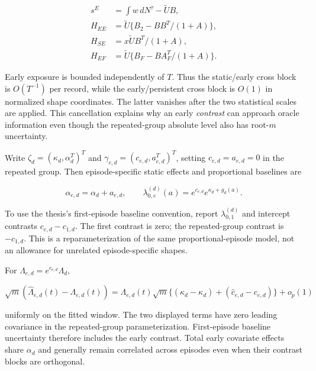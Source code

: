 \documentclass[11pt]{article}
\begin{document}
\begin{equation*}
\begin{aligned}
s^E&=\int w\,dN^\tau-\widetilde U B,\\
H_{EE}&=\widetilde U\{B_2-BB^T/(1+A)\},\\
H_{SE}&=x\widetilde U B^T/(1+A),\\
H_{EF}&=\widetilde U\{B_F-BA_F^T/(1+A)\}.
\end{aligned}\tag{53}\label{eq:53}
\end{equation*}

Early exposure is bounded independently of \(T\). Thus the static/early cross block is \(O(T^{-1})\) per record, while the early/persistent cross block is \(O(1)\) in normalized shape coordinates. The latter vanishes after the two statistical scales are applied. This cancellation explains why an early \emph{contrast} can approach oracle information even though the repeated-group absolute level also has root-\(m\) uncertainty.

Write \(\zeta_d=(\kappa_d,\alpha_d^T)^T\) and
\(\gamma_{e,d}=(c_{e,d},a_{e,d}^T)^T\), setting \(c_{e,d}=a_{e,d}=0\) in the repeated group. Then episode-specific static effects and proportional baselines are

\begin{equation*}
\alpha_{e,d}=\alpha_d+a_{e,d},\qquad
\lambda_{0,e}^{(d)}(a)=e^{c_{e,d}}e^{\kappa_d+g_d(a)}.
\tag{54}\label{eq:54}
\end{equation*}

To use the thesis's first-episode baseline convention, report \(\lambda_{0,1}^{(d)}\) and intercept contrasts \(c_{e,d}-c_{1,d}\). The first contrast is zero; the repeated-group contrast is \(-c_{1,d}\). This is a reparameterization of the same proportional-episode model, not an allowance for unrelated episode-specific shapes.

For \(\Lambda_{e,d}=e^{c_{e,d}}\Lambda_d\),

\begin{equation*}
\sqrt m(\widehat\Lambda_{e,d}(t)-\Lambda_{e,d}(t))
=\Lambda_{e,d}(t)\sqrt m\{(\widehat\kappa_d-\kappa_d)
+(\widehat c_{e,d}-c_{e,d})\}+o_p(1)
\tag{55}\label{eq:55}
\end{equation*}

uniformly on the fitted window. The two displayed terms have zero leading covariance in the repeated-group parameterization. First-episode baseline uncertainty therefore includes the early contrast. Total early covariate effects share \(\alpha_d\) and generally remain correlated across episodes even when their contrast blocks are orthogonal.
\end{document}
